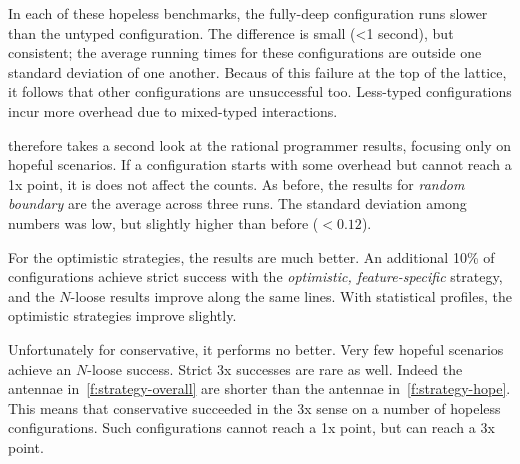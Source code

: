 In each of these hopeless benchmarks, the fully-deep configuration runs
slower than the untyped configuration.
The difference is small (<1 second), but consistent;
the average running times for these configurations are outside one standard
deviation of one another.
Becaus of this failure at the top of the lattice, it follows that other
configurations are unsuccessful too.
Less-typed configurations incur more overhead due to mixed-typed interactions.

 therefore takes a second look at the rational programmer
results, focusing only on hopeful scenarios.
If a configuration starts with some overhead but cannot reach a 1x point, it
is does not affect the counts.
As before, the results for \emph{random boundary} are the average across three
runs.
The standard deviation among numbers was low, but slightly higher than before ($<0.12$).

For the optimistic strategies, the results are much better.
An additional 10\% of configurations achieve strict success
with the \emph{optimistic, feature-specific} strategy, and
the $N$-loose results improve along the same lines.
With statistical profiles, the optimistic strategies improve
slightly.

Unfortunately for conservative, it performs no better.
Very few hopeful scenarios achieve an $N$-loose success.
Strict 3x successes are rare as well.
Indeed the antennae in~\cref{f:strategy-overall} are shorter than the
antennae in~\cref{f:strategy-hope}.
This means that conservative succeeded in the 3x sense on a number
of hopeless configurations. Such configurations cannot reach a 1x
point, but can reach a 3x point.

